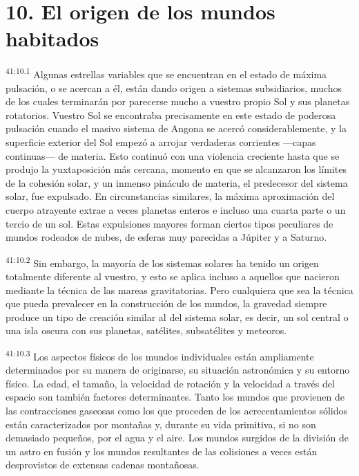 \section*{10. El origen de los mundos habitados}
\par
\textsuperscript{41:10.1} Algunas estrellas variables que se encuentran en el estado de máxima pulsación, o se acercan a él, están dando origen a sistemas subsidiarios, muchos de los cuales terminarán por parecerse mucho a vuestro propio Sol y sus planetas rotatorios. Vuestro Sol se encontraba precisamente en este estado de poderosa pulsación cuando el masivo sistema de Angona se acercó considerablemente, y la superficie exterior del Sol empezó a arrojar verdaderas corrientes ---capas continuas--- de materia. Esto continuó con una violencia creciente hasta que se produjo la yuxtaposición más cercana, momento en que se alcanzaron los límites de la cohesión solar, y un inmenso pináculo de materia, el predecesor del sistema solar, fue expulsado. En circunstancias similares, la máxima aproximación del cuerpo atrayente extrae a veces planetas enteros e incluso una cuarta parte o un tercio de un sol. Estas expulsiones mayores forman ciertos tipos peculiares de mundos rodeados de nubes, de esferas muy parecidas a Júpiter y a Saturno.

\par
\textsuperscript{41:10.2} Sin embargo, la mayoría de los sistemas solares ha tenido un origen totalmente diferente al vuestro, y esto se aplica incluso a aquellos que nacieron mediante la técnica de las mareas gravitatorias. Pero cualquiera que sea la técnica que pueda prevalecer en la construcción de los mundos, la gravedad siempre produce un tipo de creación similar al del sistema solar, es decir, un sol central o una isla oscura con sus planetas, satélites, subsatélites y meteoros.

\par
\textsuperscript{41:10.3} Los aspectos físicos de los mundos individuales están ampliamente determinados por su manera de originarse, su situación astronómica y su entorno físico. La edad, el tamaño, la velocidad de rotación y la velocidad a través del espacio son también factores determinantes. Tanto los mundos que provienen de las contracciones gaseosas como los que proceden de los acrecentamientos sólidos están caracterizados por montañas y, durante su vida primitiva, si no son demasiado pequeños, por el agua y el aire. Los mundos surgidos de la división de un astro en fusión y los mundos resultantes de las colisiones a veces están desprovistos de extensas cadenas montañosas.

